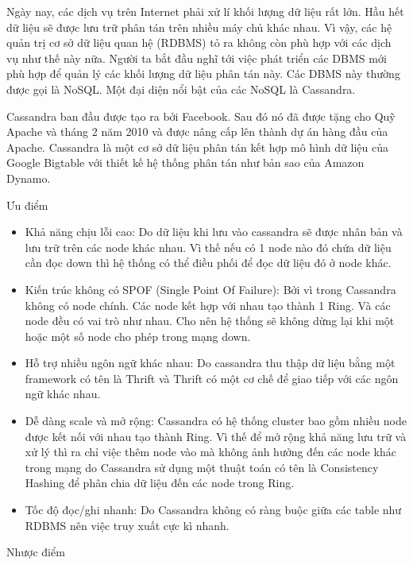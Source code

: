 \begin{itemize}
            Ngày nay, các dịch vụ trên Internet phải xử lí khối lượng dữ liệu rất lớn. Hầu hết dữ liệu sẽ được lưu trữ phân tán trên nhiều máy chủ khác nhau. Vì vậy, các hệ quản trị cơ sở dữ liệu quan hệ (RDBMS) tỏ ra không còn phù hợp với các dịch vụ như thế này nữa. Người ta bắt đầu nghĩ tới việc phát triển các DBMS mới phù hợp để quản lý các khối lượng dữ liệu phân tán này. Các DBMS này thường được gọi là NoSQL. Một đại diện nổi bật của các NoSQL là Cassandra.
            
            Cassandra ban đầu được tạo ra bởi Facebook. Sau đó nó đã được tặng cho Quỹ Apache và tháng 2 năm 2010 và được nâng cấp lên thành dự án hàng đầu của Apache. Cassandra là một cơ sở dữ liệu phân tán kết hợp mô hình dữ liệu của Google Bigtable với thiết kế hệ thống phân tán như bản sao của Amazon Dynamo. 
            
            Ưu điểm
            
            \begin{itemize}
                \item Khả năng chịu lỗi cao: Do dữ liệu khi lưu vào cassandra sẽ được nhân bản và lưu trữ trên các node khác nhau. Vì thế nếu có 1 node nào đó chứa dữ liệu cần đọc down thì hệ thống có thể điều phối để đọc dữ liệu đó ở node khác.
                \item Kiến trúc không có SPOF (Single Point Of Failure): Bởi vì trong Cassandra không có node chính. Các node kết hợp với nhau tạo thành 1 Ring. Và các node đều có vai trò như nhau. Cho nên hệ thống sẽ không dừng lại khi một hoặc một số node cho phép trong mạng down.
                \item Hỗ trợ nhiều ngôn ngữ khác nhau: Do cassandra thu thập dữ liệu bằng một framework có tên là Thrift và Thrift có một cơ chế để giao tiếp với các ngôn ngữ khác nhau.
                \item Dễ dàng scale và mở rộng: Cassandra có hệ thống cluster bao gồm nhiều node được kết nối với nhau tạo thành Ring. Vì thế để mở rộng khả năng lưu trữ và xử lý thì ra chỉ việc thêm node vào mà không ảnh hưởng đến các node khác trong mạng do Cassandra sử dụng một thuật toán có tên là Consistency Hashing để phân chia dữ liệu đến các node trong Ring.
                \item Tốc độ đọc/ghi nhanh: Do Cassandra không có ràng buộc giữa các table như RDBMS nên việc truy xuất cực kì nhanh.
            \end{itemize}
            
            Nhược điểm
            

\end{itemize}
